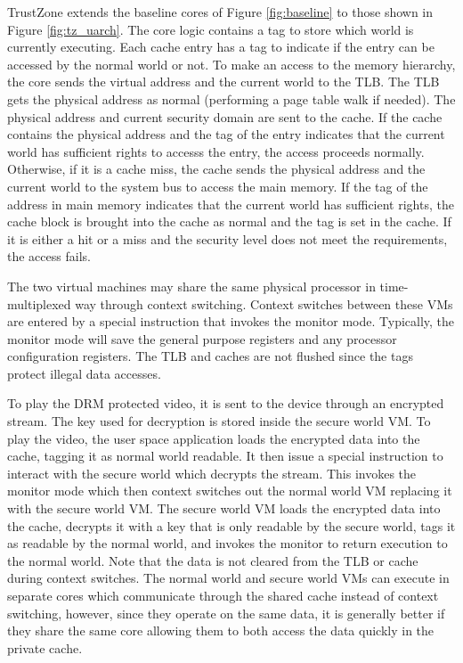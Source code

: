     TrustZone extends the baseline cores of Figure \ref{fig:baseline} to
    those shown in Figure \ref{fig:tz_uarch}. The core logic contains a tag to 
    store which world is currently executing. Each cache entry has a tag to 
    indicate if the entry can be accessed by the normal world or not. To make 
    an access to the memory hierarchy, the core sends the virtual address and 
    the current world to the TLB. The TLB gets the physical address as normal 
    (performing a page table walk if needed). The physical address and current 
    security domain are sent to the cache. If the cache contains the physical 
    address and the tag of the entry indicates that the current world has 
    sufficient rights to accesss the entry, the access proceeds normally.  
    Otherwise, if it is a cache miss, the cache sends the physical address and 
    the current world to the system bus to access the main memory. If the tag 
    of the address in main memory indicates that the current world has 
    sufficient rights, the cache block is brought into the cache as normal and 
    the tag is set in the cache. If it is either a hit or a miss and the 
    security level does not meet the requirements, the access fails.

    The two virtual machines may share the same physical processor in time-multiplexed 
    way through context switching. Context switches between these VMs are entered by a special 
    instruction that invokes the monitor mode.  Typically, the monitor mode 
    will save the general purpose registers and any processor configuration 
    registers. The TLB and caches are not flushed since the tags protect 
    illegal data accesses.

    To play the DRM protected video, it is sent to the device through an 
    encrypted stream. The key used for decryption is stored inside the secure 
    world VM. To play the video, the user space application loads the encrypted 
    data into the cache, tagging it as normal world readable. It then issue a 
    special instruction to interact with the secure world which decrypts the 
    stream. This invokes the monitor mode which then context switches out the 
    normal world VM replacing it with the secure world VM. The secure world VM 
    loads the encrypted data into the cache, decrypts it with a key that is 
    only readable by the secure world, tags it as readable by the normal world, 
    and invokes the monitor to return execution to the normal world. Note that 
    the data is not cleared from the TLB or cache during context switches. 
    The normal world and secure world VMs can execute in separate cores which 
    communicate through the shared cache instead of context switching, however, 
    since they operate on the same data, it is generally better if they share 
    the same core allowing them to both access the data quickly in the private 
    cache.
